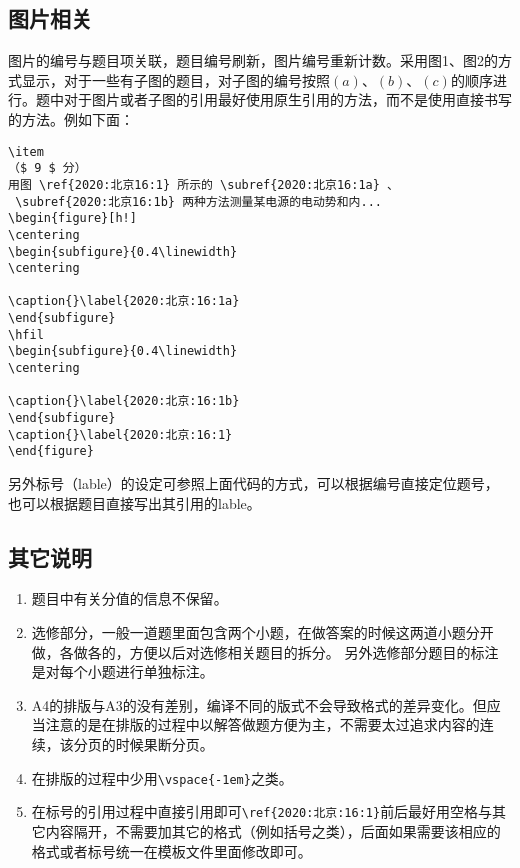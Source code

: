 \documentclass{ctexbook}
\begin{document}
\subsection{图片相关}
图片的编号与题目项关联，题目编号刷新，图片编号重新计数。采用图1、图2的方式显示，对于一些有子图的题目，对子图的编号按照$ (a) $、$ (b) $、$ (c) $的顺序进行。题中对于图片或者子图的引用最好使用原生引用的方法，而不是使用直接书写的方法。例如下面：
\begin{lstlisting}
\item 
（$ 9 $ 分）
用图 \ref{2020:北京16:1} 所示的 \subref{2020:北京16:1a} 、
 \subref{2020:北京16:1b} 两种方法测量某电源的电动势和内...
\begin{figure}[h!]
\centering
\begin{subfigure}{0.4\linewidth}
\centering
 
\caption{}\label{2020:北京:16:1a}
\end{subfigure}
\hfil
\begin{subfigure}{0.4\linewidth}
\centering
 
\caption{}\label{2020:北京:16:1b}
\end{subfigure}
\caption{}\label{2020:北京:16:1}
\end{figure}	
\end{lstlisting}

另外标号（lable）的设定可参照上面代码的方式，可以根据编号直接定位题号，也可以根据题目直接写出其引用的lable。

\subsection{其它说明}

\begin{enumerate}
	\item
题目中有关分值的信息不保留。
\item 
选修部分，一般一道题里面包含两个小题，在做答案的时候这两道小题分开做，各做各的，方便以后对选修相关题目的拆分。
另外选修部分题目的标注是对每个小题进行单独标注。


\item 
A4的排版与A3的没有差别，编译不同的版式不会导致格式的差异变化。但应当注意的是在排版的过程中以解答做题方便为主，不需要太过追求内容的连续，该分页的时候果断分页。	

\item 
在排版的过程中少用\lstinline|\vspace{-1em}|之类。


\item 
在标号的引用过程中直接引用即可\lstinline|\ref{2020:北京:16:1}|前后最好用空格与其它内容隔开，不需要加其它的格式（例如括号之类），后面如果需要该相应的格式或者标号统一在模板文件里面修改即可。

\end{enumerate}
\end{document}
